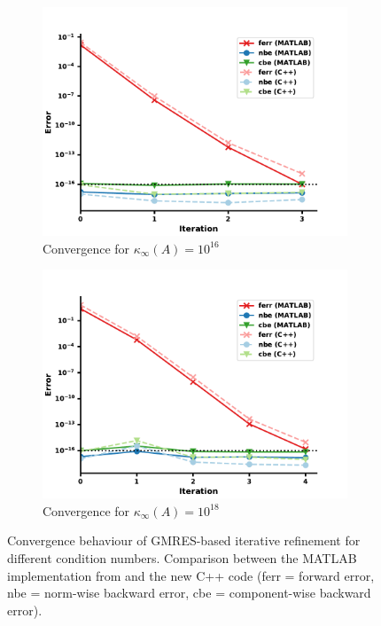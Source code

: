 \begin{figure}
\centering
\begin{subfigure}{.5\textwidth}
  \centering
  \includegraphics[width=\linewidth]{chapters/5_experiments/figures/GMRESe16.pdf}
  \caption{Convergence for $\kappa_\infty(A) = 10^{16}$}
  \label{fig:gmrese16}
\end{subfigure}%
\begin{subfigure}{.5\textwidth}
  \centering
  \includegraphics[width=\linewidth]{chapters/5_experiments/figures/GMRESe18.pdf}
  \caption{Convergence for $\kappa_\infty(A) = 10^{18}$}
  \label{fig:gmrese18}
\end{subfigure}
\caption[GMRES-based IR]{Convergence behaviour of GMRES-based iterative refinement for different condition numbers. Comparison between the MATLAB implementation from \cite{carson_new_2017} and the new C++ code (ferr = forward error, nbe = norm-wise backward error, cbe = component-wise backward error).}
\label{fig:gmrese_ir}
\end{figure}

